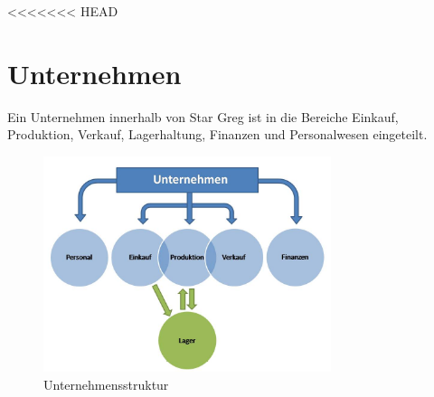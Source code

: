 <<<<<<< HEAD
\newpage
\section{Unternehmen}
\label{sec:spielwelt-unternehmen}


Ein Unternehmen innerhalb von Star Greg ist in die Bereiche Einkauf, Produktion, Verkauf, Lagerhaltung, Finanzen und Personalwesen eingeteilt. 

\begin{figure}[ht]
\centering
\includegraphics[width=0.75\textwidth]{20_Spielwelt/20_Unternehmen/Unternehmensstruktur.jpg}
\caption{Unternehmensstruktur}
\end{figure}

